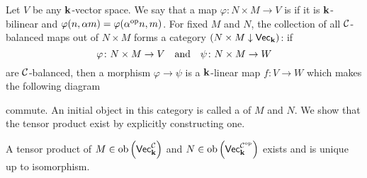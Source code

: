 Let $V$ be any $\mathbf{k}$-vector space. 
We say that a map $\varphi\colon N\times M\to V$ is  if it is $\mathbf{k}$-bilinear and $\varphi(n,\alpha m)=\varphi(\alpha^{\text{op}}n, m)$.
For fixed $M$ and $N$, the collection of all $\mathcal{C}$-balanced maps out of $N\times M$ forms a category $\left(N\times M\downarrow \normalfont\mathsf{Vec}_{\mathbf{k}}\right)$: if
\[ \varphi\colon N\times M\to V\quad\text{and}\quad \psi\colon N\times M\to W \]
are $\mathcal{C}$-balanced, then a morphism $\varphi\to \psi$ is a $\mathbf{k}$-linear map $f\colon V\to W$ which makes the following diagram
\begin{center}
\end{center}
commute.
An initial object in this category is called a  of $M$ and $N$.
We show that the tensor product exist by explicitly constructing one.
\begin{proposition}
    A tensor product of $M\in\operatorname{ob}\left(\normalfont\mathsf{Vec}_{\mathbf{k}}^{\mathcal{C}}\right)$ and $N\in\operatorname{ob}\left(\normalfont\mathsf{Vec}_{\mathbf{k}}^{\mathcal{C}^{\text{op}}}\right)$ exists and is unique up to isomorphism.
\end{proposition}
